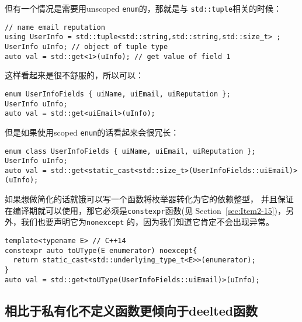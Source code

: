 但有一个情况是需要用unscoped \texttt{enum}的，那就是与
\texttt{std::tuple}相关的时候：
\begin{verbatim}
// name email reputation
using UserInfo = std::tuple<std::string,std::string,std::size_t> ;
UserInfo uInfo; // object of tuple type
auto val = std::get<1>(uInfo); // get value of field 1
\end{verbatim}
这样看起来是很不舒服的，所以可以：
\begin{verbatim}
enum UserInfoFields { uiName, uiEmail, uiReputation };
UserInfo uInfo;
auto val = std::get<uiEmail>(uInfo);
\end{verbatim}
但是如果使用scoped \texttt{enum}的话看起来会很冗长：
\begin{verbatim}
enum class UserInfoFields { uiName, uiEmail, uiReputation };
UserInfo uInfo;
auto val = std::get<static_cast<std::size_t>(UserInfoFields::uiEmail)>(uInfo);
\end{verbatim}

如果想做简化的话就饿可以写一个函数将枚举器转化为它的依赖整型，
并且保证在编译期就可以使用，那它必须是\texttt{constexpr}函数(见
Section~\ref{sec:Item2-15})，另外，我们也要声明它为\texttt{nonexcept}
的，因为我们知道它肯定不会出现异常。
\begin{verbatim}
template<typename E> // C++14
constexpr auto toUType(E enumerator) noexcept{
  return static_cast<std::underlying_type_t<E>>(enumerator);
}
auto val = std::get<toUType(UserInfoFields::uiEmail)>(uInfo);
\end{verbatim}

\subsection{相比于私有化不定义函数更倾向于deelted函数}
\label{sec:Item2-11}

